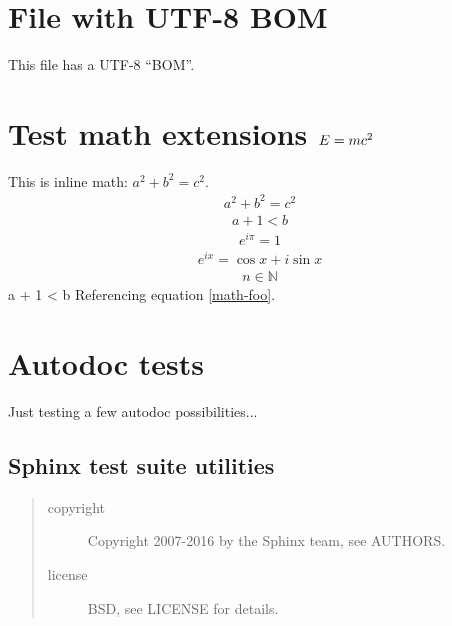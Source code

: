 \documentclass[letterpaper,10pt,english]{sphinxhowto}
\begin{document}
\section{File with UTF-8 BOM}
\label{bom::doc}\label{bom:file-with-utf-8-bom}
This file has a UTF-8 ``BOM''.


\section{Test math extensions \protect\(E = m c^2\protect\)}
\label{math:test-math-extensions}\label{math::doc}
This is inline math: \(a^2 + b^2 = c^2\).
\begin{equation*}
\begin{split}a^2 + b^2 = c^2\end{split}
\end{equation*}\begin{equation*}
\begin{split}a + 1 < b\end{split}
\end{equation*}\label{math:equation-foo}\begin{equation}\label{math-foo}
\begin{split}e^{i\pi} = 1\end{split}
\end{equation}\begin{equation*}
\begin{split}e^{ix} = \cos x + i\sin x\end{split}
\end{equation*}\begin{equation*}
\begin{split}n \in \mathbb N\end{split}
\end{equation*}a + 1 < b
Referencing equation \eqref{math-foo}.


\section{Autodoc tests}
\label{autodoc:autodoc-tests}\label{autodoc::doc}
Just testing a few autodoc possibilities...
\label{autodoc:module-util}

\subsection{Sphinx test suite utilities}
\label{autodoc:sphinx-test-suite-utilities}\begin{quote}\begin{description}
\item[{copyright}] \leavevmode
Copyright 2007-2016 by the Sphinx team, see AUTHORS.

\item[{license}] \leavevmode
BSD, see LICENSE for details.

\end{description}\end{quote}
\label{autodoc:module-test_autodoc}
\end{document}
